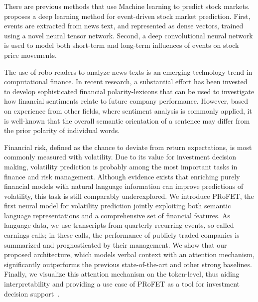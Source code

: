 \documentclass[11pt]{article}
\begin{document}
There are previous methods that use Machine learning to predict stock
markets.~\cite{ding2015} proposes a deep learning method for
event-driven stock market prediction. First, events are extracted from news text, and represented as dense vectors,
trained using a novel neural tensor network. Second, a deep convolutional neural network is used to model both short-term and
long-term influences of events on stock price movements.

The use of robo-readers to analyze news texts is an emerging technology trend in computational finance. In recent
research, a substantial effort has been invested to develop sophisticated financial polarity-lexicons that can be used to
investigate how financial sentiments relate to future company performance. However, based on experience from other
fields, where sentiment analysis is commonly applied, it is well-known
that the overall semantic orientation of a sentence may differ from
the prior polarity of individual words.

Financial risk, defined as the chance to deviate from return expectations, is most commonly measured
with volatility. Due to its value for investment decision making, volatility prediction is probably
among the most important tasks in finance and risk management. Although evidence exists that enriching purely financial models with natural language
information can improve predictions of volatility, this task is still comparably underexplored. We introduce PRoFET, the
first neural model for volatility prediction jointly exploiting both
semantic language representations and a comprehensive set of financial
features. As language data, we use transcripts from quarterly
recurring events, so-called earnings calls; in these calls, the performance of publicly traded companies is summarized and prognosticated by their management. We show that our
proposed architecture, which models verbal context with an attention mechanism, significantly outperforms the previous state-of-the-art and other strong
baselines. Finally, we visualize this attention mechanism on the token-level, thus aiding interpretability and providing a use case of PRoFET as a tool
for investment decision support~\cite{theil2019}.




\end{document}
